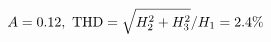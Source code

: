 \documentclass[preview]{standalone}
\begin{document}
\begin{align*}
\special{dvisvgm:raw <g id='unique000'>}A=0.12,\ \text{THD}=\sqrt{H_2^2+H_3^2}/H_1=2.4\%\special{dvisvgm:raw </g>}
\end{align*}
\end{document}

